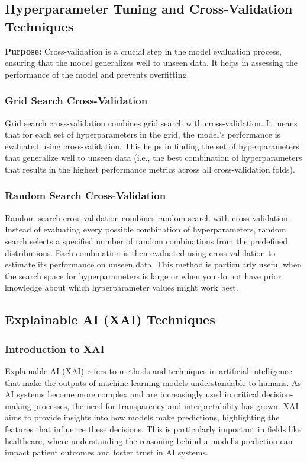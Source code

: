 \documentclass[a4paper,12pt]{report}
\begin{document}
\subsection{Hyperparameter Tuning and Cross-Validation Techniques}
 \textbf{Purpose:} Cross-validation is a crucial step in the model evaluation process, ensuring that the model generalizes well to unseen data. It helps in assessing the performance of the model and prevents overfitting. 
\subsubsection{Grid Search Cross-Validation}
 Grid search cross-validation combines grid search with cross-validation. It means that for each set of hyperparameters in the grid, the model's performance is evaluated using cross-validation.
This helps in finding the set of hyperparameters that generalize well to unseen data (i.e., the best combination of hyperparameters that results in the highest performance metrics across all cross-validation folds).

\subsubsection{Random Search Cross-Validation}
 Random search cross-validation combines random search with cross-validation. Instead of evaluating every possible combination of hyperparameters, random search selects a specified number of random combinations from the predefined distributions.
 Each combination is then evaluated using cross-validation to estimate its performance on unseen data.
 This method is particularly useful when the search space for hyperparameters is large or when you do not have prior knowledge about which hyperparameter values might work best.


\subsection{Explainable AI (XAI) Techniques}

\subsubsection{Introduction to XAI}
Explainable AI (XAI) refers to methods and techniques in artificial intelligence that make the outputs of machine learning models understandable to humans. As AI systems become more complex and are increasingly used in critical decision-making processes, the need for transparency and interpretability has grown. XAI aims to provide insights into how models make predictions, highlighting the features that influence these decisions. This is particularly important in fields like healthcare, where understanding the reasoning behind a model's prediction can impact patient outcomes and foster trust in AI systems.
\end{document}
